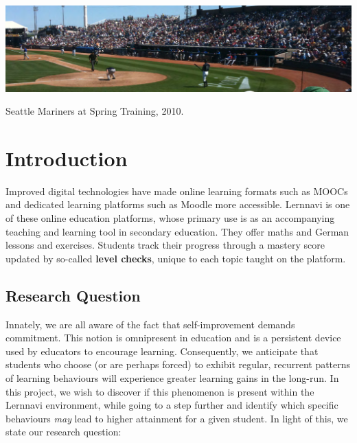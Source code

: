 \documentclass[sigplan,screen]{acmart}
\begin{document}
\begin{teaserfigure}
  \includegraphics[width=\textwidth]{reports/figures/sampleteaser.pdf}
  \caption{Seattle Mariners at Spring Training, 2010.}
  \label{fig:teaser}
\end{teaserfigure}

\maketitle

\section{Introduction}\label{sec:intro}
Improved digital technologies have made online learning formats such as MOOCs and dedicated learning platforms such as Moodle more accessible. Lernnavi is one of these online education platforms, whose primary use is as an accompanying teaching and learning tool in secondary education. They offer maths and German lessons and exercises. Students track their progress through a mastery score updated by so-called \textbf{level checks}, unique to each topic taught on the platform. 

\subsection{Research Question}\label{subsec:researchQ}

Innately, we are all aware of the fact that self-improvement demands commitment. This notion is omnipresent in education and is a persistent device used by educators to encourage learning. Consequently, we anticipate that students who choose (or are perhaps forced) to exhibit regular, recurrent patterns of learning behaviours will experience greater learning gains in the long-run. In this project, we wish to discover if this phenomenon is present within the Lernnavi environment, while going to a step further and identify which specific behaviours \textit{may} lead to higher attainment for a given student. In light of this, we state our research question:
\end{document}
